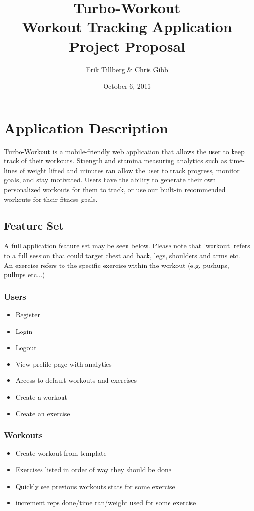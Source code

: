 \documentclass{article}
\title{Turbo-Workout \\ Workout Tracking Application \\ Project Proposal}
\author{Erik Tillberg & Chris Gibb}
\date{October 6, 2016}
\begin{document}
\maketitle

\section{Application Description}

Turbo-Workout is a mobile-friendly web application that allows the user to keep track of their workouts. Strength and stamina measuring analytics such as time-lines of weight lifted and minutes ran allow the user to track progress, monitor goals, and stay motivated. Users have the ability to generate their own personalized workouts for them to track, or use our built-in recommended workouts for their fitness goals.

\subsection{Feature Set}
A full application feature set may be seen below. Please note that 'workout' refers to a full session that could target chest and back, legs, shoulders and arms etc. An exercise refers to the specific exercise within the workout (e.g. pushups, pullups etc...)
\subsubsection{Users}
\begin{itemize}
    \item {Register}
    \item {Login}
    \item {Logout}
    \item {View profile page with analytics}
    \item {Access to default workouts and exercises}
    \item {Create a workout}
    \item {Create an exercise}
\end{itemize}

\subsubsection{Workouts}
\begin{itemize}
    \item {Create workout from template}
    \item {Exercises listed in order of way they should be done}
    \item {Quickly see previous workouts stats for some exercise}
    \item {increment reps done/time ran/weight used for some exercise}
\end{itemize}
\end{document}
